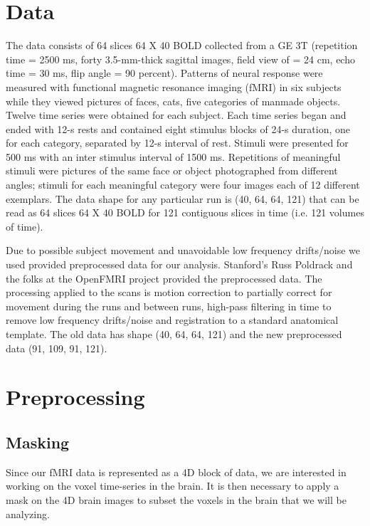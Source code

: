 \documentclass[11pt]{article}
\begin{document}
\section{Data}

The data consists of 64 slices  64 X 40 BOLD collected from a GE 3T (repetition 
time = 2500 ms, forty 3.5-mm-thick sagittal images, field view of = 24 cm, echo 
time = 30 ms, flip angle = 90 percent). Patterns of neural response were 
measured with functional magnetic resonance imaging (fMRI) in six subjects 
while they viewed pictures of faces, cats, five categories of manmade objects. 
Twelve time series were obtained for each subject. Each time series began and 
ended with 12-s rests and contained eight stimulus blocks of 24-s duration, one 
for each category, separated by 12-s interval of rest. Stimuli were presented 
for 500 ms with an inter stimulus interval of 1500 ms. Repetitions of 
meaningful stimuli were pictures of the same face or object photographed from 
different angles; stimuli for each meaningful category were four images each of 
12 different exemplars. The data shape for any particular run is (40, 64, 64, 
121) that can be read as 64 slices 64 X 40 BOLD for 121 contiguous slices in 
time (i.e. 121 volumes of time).

Due to possible subject movement and unavoidable low frequency drifts/noise we used provided preprocessed data for our analysis. Stanford’s Russ Poldrack and the folks at the OpenFMRI project provided the preprocessed data. The processing applied to the scans is motion correction to partially correct for movement during the runs and between runs, high-pass filtering in time to remove low frequency drifts/noise and registration to a standard anatomical template.  The old data has shape (40, 64, 64, 121) and the new preprocessed data (91, 109, 91, 121).

\section{Preprocessing}

\subsection{Masking}

Since our fMRI data is represented as a 4D block of data, we are interested in 
working on the voxel time-series in the brain. It is then necessary to apply a 
mask on the 4D brain images to subset the voxels in the brain that we will be 
analyzing.
\end{document}
